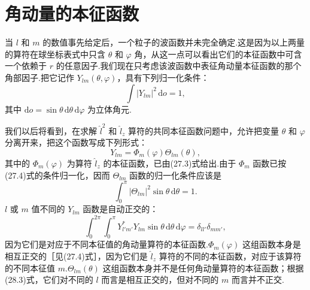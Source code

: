 \section{角动量的本征函数}

当 $l$ 和 $m$ 的数值事先给定后，一个粒子的波函数并未完全确定.这是因为以上两量的算符在球坐标表式中只含 $\theta$ 和 $\varphi$ 角，从这一点可以看出它们的本征函数中可含一个依赖于 $r$ 的任意因子.我们现在只考虑该波函数中表征角动量本征函数的那个角部因子.把它记作 $Y_{lm}(\theta,\varphi)$，具有下列归一化条件：
\begin{equation*}
  \int|Y_{lm}|^2\,\mathrm{d}o=1,
\end{equation*}
其中 $\mathrm{d}o=\sin\theta\,\mathrm{d}\theta\,\mathrm{d}\varphi$ 为立体角元.

我们以后将看到，在求解 $\hat{l}^2$ 和 $\hat{l}_z$ 算符的共同本征函数问题中，允许把变量 $\theta$ 和 $\varphi$ 分离开来，把这个函数写成下列形式：
\begin{equation}
  Y_{lm}=\varPhi_m(\varphi)\varTheta_{lm}(\theta),
\end{equation}
其中的 $\varPhi_m(\varphi)$ 为算符 $\hat{l}_z$ 的本征函数，已由(27.3)式给出.由于 $\varPhi_m$ 函数已按(27.4)式的条件归一化，因而 $\varTheta_{lm}$ 函数的归一化条件应该是
\begin{equation}
  \int_0^{\pi}|\varTheta_{lm}|^2\sin\theta\,\mathrm{d}\theta=1.
\end{equation}
$l$ 或 $m$ 值不同的 $Y_{lm}$ 函数是自动正交的：
\begin{equation}
  \int_0^{2\pi}\!\!\int_0^{\pi}Y_{l'm'}^{*}Y_{lm}\sin\theta\,\mathrm{d}\theta\,\mathrm{d}\varphi
  =\delta_{ll'}\delta_{mm'},
\end{equation}
因为它们是对应于不同本征值的角动量算符的本征函数.$\varPhi_m(\varphi)$ 这组函数本身是相互正交的［见(27.4)式］，因为它们是 $\hat{l}_z$ 算符的不同的本征函数，对应于该算符的不同本征值 $m$.$\varTheta_{lm}(\theta)$ 这组函数本身并不是任何角动量算符的本征函数；根据(28.3)式，它们对不同的 $l$ 而言是相互正交的，但对不同的 $m$ 而言并不正交.

